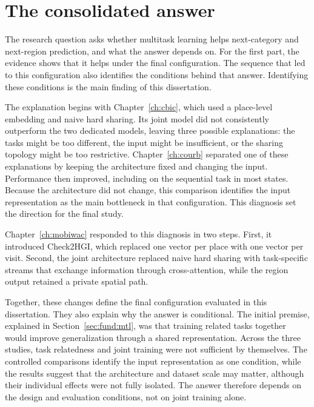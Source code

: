 \section{The consolidated answer}
\label{sec:conc:answer}

The research question asks whether multitask learning helps next-category and
next-region prediction, and what the answer depends on. For the first part, the evidence
shows that it helps under the final configuration. The sequence that led to this
configuration also identifies the conditions behind that answer. Identifying these
conditions is the main finding of this dissertation.

The explanation begins with Chapter~\ref{ch:cbic}, which used a place-level embedding and
naive hard sharing. Its joint model did not consistently outperform the two dedicated
models, leaving three possible explanations: the tasks might be too different, the input
might be insufficient, or the sharing topology might be too restrictive.
Chapter~\ref{ch:courb} separated one of these explanations by
keeping the architecture fixed and changing the input. Performance then improved,
including on the sequential task in most states. Because the architecture did not
change, this comparison identifies the input representation as the main bottleneck in
that configuration. This diagnosis set the direction for the final study.

Chapter~\ref{ch:mobiwac} responded to this diagnosis in two steps. First, it introduced
Check2HGI, which replaced one vector per place with one vector per visit. Second, the
joint architecture replaced naive hard sharing with task-specific streams that exchange
information through cross-attention, while the region output retained a private spatial
path.

Together, these changes define the final configuration evaluated in this dissertation.
They also explain why the answer is conditional. The initial premise, explained in
Section~\ref{sec:fund:mtl}, was that training related tasks together would improve
generalization through a shared representation. Across the three studies, task
relatedness and joint training were not sufficient by themselves.
The controlled comparisons identify the input representation as one condition,
while the results suggest that the architecture and dataset scale may matter, although their
individual effects were not fully isolated. The answer therefore depends on the design and
evaluation conditions, not on joint training alone.

